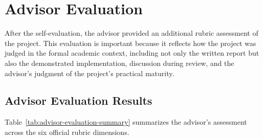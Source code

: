 \section{Advisor Evaluation}
\label{section:advisor-evaluation}

After the self-evaluation, the advisor provided an additional rubric
assessment of the project. This evaluation is important because it
reflects how the project was judged in the formal academic context,
including not only the written report but also the demonstrated
implementation, discussion during review, and the advisor's judgment
of the project's practical maturity.

\subsection{Advisor Evaluation Results}
\label{subsection:advisor-evaluation-results}

Table~\ref{tab:advisor-evaluation-summary} summarizes the advisor's
assessment across the six official rubric dimensions.

